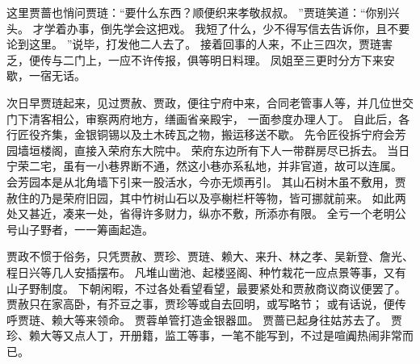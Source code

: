 \par
这里贾蔷也悄问贾琏：“要什么东西？顺便织来孝敬叔叔。
”贾琏笑道：“你别兴头。
才学着办事，倒先学会这把戏。
我短了什么，少不得写信去告诉你，且不要论到这里。
”说毕，打发他二人去了。
接着回事的人来，不止三四次，贾琏害乏，便传与二门上，一应不许传报，俱等明日料理。
凤姐至三更时分方下来安歇，一宿无话。
\par
次日早贾琏起来，见过贾赦、贾政，便往宁府中来，合同老管事人等，并几位世交门下清客相公，审察两府地方，缮画省亲殿宇，
一面参度办理人丁。
自此后，各行匠役齐集，金银铜锡以及土木砖瓦之物，搬运移送不歇。
先令匠役拆宁府会芳园墙垣楼阁，直接入荣府东大院中。
荣府东边所有下人一带群房尽已拆去。
当日宁荣二宅，虽有一小巷界断不通，然这小巷亦系私地，并非官道，故可以连属。
会芳园本是从北角墙下引来一股活水，今亦无烦再引。
其山石树木虽不敷用，贾赦住的乃是荣府旧园，其中竹树山石以及亭榭栏杆等物，皆可挪就前来。
如此两处又甚近，凑来一处，省得许多财力，纵亦不敷，所添亦有限。
全亏一个老明公号山子野者，一一筹画起造。
\par
贾政不惯于俗务，只凭贾赦、贾珍、贾琏、赖大、来升、林之孝、吴新登、詹光、程日兴等几人安插摆布。
凡堆山凿池、起楼竖阁、种竹栽花一应点景等事，又有山子野制度。
下朝闲暇，不过各处看望看望，最要紧处和贾赦商议商议便罢了。
贾赦只在家高卧，有芥豆之事，贾珍等或自去回明，或写略节；
或有话说，便传呼贾琏、赖大等来领命。
贾蓉单管打造金银器皿。
贾蔷已起身往姑苏去了。
贾珍、赖大等又点人丁，开册籍，监工等事，一笔不能写到，不过是喧阗热闹非常而已。
